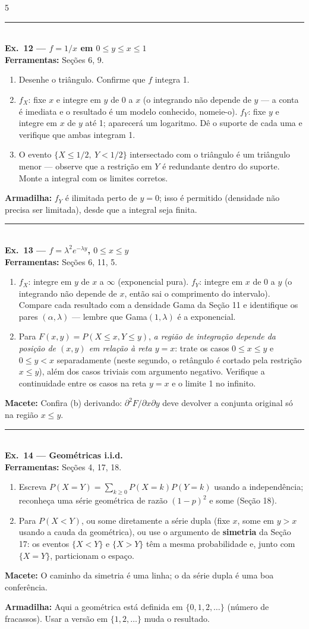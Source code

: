 \documentclass[a4paper,8pt]{extarticle}
\newcommand{\tit}[1]{\vspace{2pt}\textcolor{azul}{\rule{\linewidth}{0.6pt}}\\[1pt]\textbf{\textcolor{azul}{#1}}\\[1pt]}
\newcommand{\mac}[1]{\textcolor{verde}{\textbf{Macete:}} #1\par}
\newcommand{\arm}[1]{\textcolor{vinho}{\textbf{Armadilha:}} #1\par}
\newcommand{\ferr}[1]{\textbf{Ferramentas:} #1\par}
\begin{document}
\begin{multicols*}{5}
\tit{Ex.\ 12 — $f=1/x$ em $0\le y\le x\le1$}
\ferr{Seções 6, 9.}
\begin{enumerate}
\item Desenhe o triângulo. Confirme que $f$ integra 1.
\item[(a)] $f_X$: fixe $x$ e integre em $y$ de 0 a $x$ (o integrando não depende de $y$ — a conta é imediata e o resultado é um modelo conhecido, nomeie-o). $f_Y$: fixe $y$ e integre em $x$ de $y$ até 1; aparecerá um logaritmo. Dê o suporte de cada uma e verifique que ambas integram 1.
\item[(b)] O evento $\{X\le 1/2,\ Y<1/2\}$ intersectado com o triângulo é um triângulo menor — observe que a restrição em $Y$ é redundante dentro do suporte. Monte a integral com os limites corretos.
\end{enumerate}
\arm{$f_Y$ é ilimitada perto de $y=0$; isso é permitido (densidade não precisa ser limitada), desde que a integral seja finita.}

\tit{Ex.\ 13 — $f=\lambda^2e^{-\lambda y}$, $0\le x\le y$}
\ferr{Seções 6, 11, 5.}
\begin{enumerate}
\item[(a)] $f_X$: integre em $y$ de $x$ a $\infty$ (exponencial pura). $f_Y$: integre em $x$ de 0 a $y$ (o integrando não depende de $x$, então sai o comprimento do intervalo). Compare cada resultado com a densidade Gama da Seção 11 e identifique os pares $(\alpha,\lambda)$ — lembre que Gama$(1,\lambda)$ é a exponencial.
\item[(b)] Para $F(x,y)=P(X\le x,Y\le y)$, \emph{a região de integração depende da posição de $(x,y)$ em relação à reta $y=x$}: trate os casos $0\le x\le y$ e $0\le y<x$ separadamente (neste segundo, o retângulo é cortado pela restrição $x\le y$), além dos casos triviais com argumento negativo. Verifique a continuidade entre os casos na reta $y=x$ e o limite 1 no infinito.
\end{enumerate}
\mac{Confira (b) derivando: $\partial^2F/\partial x\partial y$ deve devolver a conjunta original só na região $x\le y$.}

\tit{Ex.\ 14 — Geométricas i.i.d.}
\ferr{Seções 4, 17, 18.}
\begin{enumerate}
\item Escreva $P(X=Y)=\sum_{k\ge0}P(X=k)P(Y=k)$ usando a independência; reconheça uma série geométrica de razão $(1-p)^2$ e some (Seção 18).
\item Para $P(X<Y)$, ou some diretamente a série dupla (fixe $x$, some em $y>x$ usando a cauda da geométrica), ou use o argumento de \textbf{simetria} da Seção 17: os eventos $\{X<Y\}$ e $\{X>Y\}$ têm a mesma probabilidade e, junto com $\{X=Y\}$, particionam o espaço.
\end{enumerate}
\mac{O caminho da simetria é uma linha; o da série dupla é uma boa conferência.}
\arm{Aqui a geométrica está definida em $\{0,1,2,\dots\}$ (número de fracassos). Usar a versão em $\{1,2,\dots\}$ muda o resultado.}


\end{multicols*}
\end{document}
